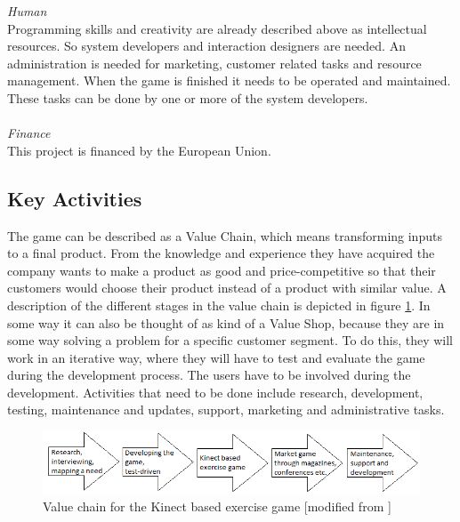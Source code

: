 \emph{Human} \\ Programming skills and creativity are already described above as intellectual resources. So system developers and interaction designers are needed. An administration is needed for marketing, customer related tasks and resource management. When the game is finished it needs to be operated and maintained. These tasks can be done by one or more of the system developers. \\ \\
\emph{Finance} \\ This project is financed by the European Union. 
\subsection{Key Activities}
The game can be described as a Value Chain, which means transforming inputs to a final product. From the knowledge and experience they have acquired the company wants to make a product as good and price-competitive so that their customers would choose their product instead of a product with similar value. A description of the different stages in the value chain is depicted in figure \ref{fig:ValueChainCase}. In some way it can also be thought of as kind of a Value Shop, because they are in some way solving a problem for a specific customer segment. To do this, they will work in an iterative way, where they will have to test and evaluate the game during the development process. The users have to be involved during the development. 
Activities that need to be done include research, development, testing, maintenance and updates, support, marketing and administrative tasks. 

\begin{figure}
\label{fig:ValueChainCase}
\begin{center}
\includegraphics[scale=0.7]{valuechaincase}
\caption[Value Chain for the Kinect Based Exercise Game]{Value chain for the Kinect based exercise game [modified from \cite{osterwalderthesis}]}
\end{center}
\end{figure}
\newpage

